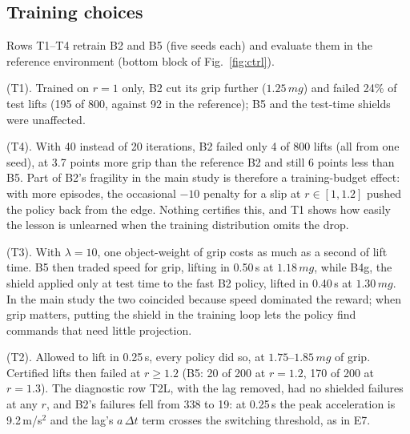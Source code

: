 \subsection{Training choices}\label{sec:trainrows}
Rows T1--T4 retrain B2 and B5 (five seeds each) and evaluate them in the reference environment (bottom block of
Fig.~\ref{fig:ctrl}).

 (T1). Trained on $r=1$ only, B2 cut its grip
further ($1.25\,mg$) and failed 24\% of test lifts (195 of 800, against 92 in the reference); B5 and the test-time shields
were unaffected.

 (T4). With 40 instead of 20 iterations, B2
failed only 4 of 800 lifts (all from one seed), at 3.7 points more grip than the reference B2 and still 6 points less than
B5. Part of B2's fragility in the main study is therefore a training-budget effect: with more episodes, the occasional $-10$
penalty for a slip at $r\in[1,1.2]$ pushed the policy back from the edge. Nothing certifies this, and T1 shows how easily the
lesson is unlearned when the training distribution omits the drop.

 (T3). With $\lambda=10$, one object-weight of
grip costs as much as a second of lift time. B5 then traded speed for grip, lifting in 0.50\,s at $1.18\,mg$, while B4g, the
shield applied only at test time to the fast B2 policy, lifted in 0.40\,s at $1.30\,mg$. In the main study the two coincided
because speed dominated the reward; when grip matters, putting the shield in the training loop lets the policy find
commands that need little projection.

 (T2). Allowed to lift in 0.25\,s, every policy did so, at
$1.75$--$1.85\,mg$ of grip. Certified lifts then failed at $r\ge1.2$ (B5: 20 of 200 at $r=1.2$, 170 of 200 at $r=1.3$). The
diagnostic row T2L, with the lag removed, had no shielded failures at any $r$, and B2's failures fell from 338 to 19: at
0.25\,s the peak acceleration is 9.2\,m/s$^2$ and the lag's $a\,\Delta t$ term crosses the switching threshold, as in E7.
